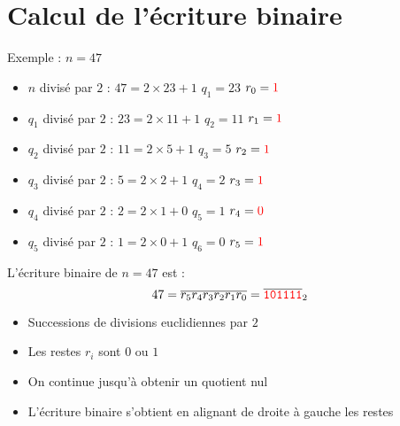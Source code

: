 \section{Calcul de l'écriture binaire}



\begin{frame}

\pause
Exemple : $n = 47$
\begin{itemize}
\pause
\item $n$ divisé par $2$ :   $47 = 2\times 23 + 1$ \hfill\qquad $q_1=23$ \qquad $r_0={\color{red}1}$\qquad \qquad \qquad 
\pause
\item $q_1$ divisé par $2$ : $23 = 2\times 11 + 1$ \hfill\qquad $q_2=11$ \qquad $r_1={\color{red}1}$\qquad \qquad \qquad 
\pause
\item $q_2$ divisé par $2$ : $11 = 2\times 5 + 1$ \hfill\qquad $q_3=5$ \qquad $r_2={\color{red}1}$\qquad \qquad \qquad 
\pause
\item $q_3$ divisé par $2$ : $5 = 2\times 2 + 1$ \hfill\qquad $q_4=2$ \qquad $r_3={\color{red}1}$\qquad \qquad \qquad 
\pause
\item $q_4$ divisé par $2$ : $2 = 2\times 1 + 0$ \hfill\qquad $q_5=1$ \qquad $r_4={\color{red}0}$\qquad \qquad \qquad 
\pause
\item $q_5$ divisé par $2$ : $1 = 2\times 0 + 1$ \hfill\qquad $q_6=0$ \qquad $r_5={\color{red}1}$\qquad \qquad \qquad 
\pause
\end{itemize}

\medskip


L'écriture binaire de $n=47$ est :
\[47 = \overline{r_{5}r_{4}r_{3}r_{2}r_{1}r_{0}} = \overline{{\color{red}\mathtt{101111}}}_2\]


\begin{itemize}
\pause
  \item Successions de divisions euclidiennes par $2$
\pause
  \item Les restes $r_i$ sont $0$ ou $1$
\pause
  \item On continue jusqu'à obtenir un quotient nul
\pause
  \item L'écriture binaire s'obtient en alignant de droite à gauche les restes
\end{itemize}


\end{frame}


